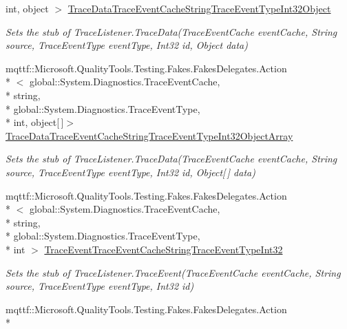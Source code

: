 \begin{DoxyCompactItemize}
int, object $>$ \hyperlink{class_system_1_1_diagnostics_1_1_fakes_1_1_stub_console_trace_listener_a5166016cbd703ff6bf9ee37510ea2070}{Trace\-Data\-Trace\-Event\-Cache\-String\-Trace\-Event\-Type\-Int32\-Object}
\begin{DoxyCompactList}\small\item\em Sets the stub of Trace\-Listener.\-Trace\-Data(\-Trace\-Event\-Cache event\-Cache, String source, Trace\-Event\-Type event\-Type, Int32 id, Object data)\end{DoxyCompactList}\item 
mqttf\-::\-Microsoft.\-Quality\-Tools.\-Testing.\-Fakes.\-Fakes\-Delegates.\-Action\\*
$<$ global\-::\-System.\-Diagnostics.\-Trace\-Event\-Cache, \\*
string, \\*
global\-::\-System.\-Diagnostics.\-Trace\-Event\-Type, \\*
int, object\mbox{[}$\,$\mbox{]}$>$ \hyperlink{class_system_1_1_diagnostics_1_1_fakes_1_1_stub_console_trace_listener_a403d1f10e1c31996ba56f1d44f189f17}{Trace\-Data\-Trace\-Event\-Cache\-String\-Trace\-Event\-Type\-Int32\-Object\-Array}
\begin{DoxyCompactList}\small\item\em Sets the stub of Trace\-Listener.\-Trace\-Data(\-Trace\-Event\-Cache event\-Cache, String source, Trace\-Event\-Type event\-Type, Int32 id, Object\mbox{[}$\,$\mbox{]} data)\end{DoxyCompactList}\item 
mqttf\-::\-Microsoft.\-Quality\-Tools.\-Testing.\-Fakes.\-Fakes\-Delegates.\-Action\\*
$<$ global\-::\-System.\-Diagnostics.\-Trace\-Event\-Cache, \\*
string, \\*
global\-::\-System.\-Diagnostics.\-Trace\-Event\-Type, \\*
int $>$ \hyperlink{class_system_1_1_diagnostics_1_1_fakes_1_1_stub_console_trace_listener_a4c58a8db911521908a32635c65e29b0e}{Trace\-Event\-Trace\-Event\-Cache\-String\-Trace\-Event\-Type\-Int32}
\begin{DoxyCompactList}\small\item\em Sets the stub of Trace\-Listener.\-Trace\-Event(\-Trace\-Event\-Cache event\-Cache, String source, Trace\-Event\-Type event\-Type, Int32 id)\end{DoxyCompactList}\item 
mqttf\-::\-Microsoft.\-Quality\-Tools.\-Testing.\-Fakes.\-Fakes\-Delegates.\-Action\\*

\end{DoxyCompactItemize}
